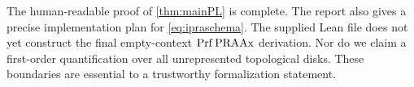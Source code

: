 \begin{remark}
The human-readable proof of \cref{thm:mainPL} is complete.  The report also gives a precise implementation plan for \cref{eq:ipraschema}.  The supplied Lean file does not yet construct the final empty-context \(\mathrm{Prf}\,\mathrm{PRAAx}\) derivation.  Nor do we claim a first-order quantification over all unrepresented topological disks.  These boundaries are essential to a trustworthy formalization statement.
\end{remark}
